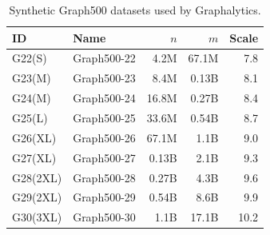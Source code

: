 \begin{table}[h]
\caption{Synthetic Graph500 datasets used by Graphalytics.}
\label{tab:graph500-datasets}
\centering
\begin{tabular}{|l|l|r|r|r|}
\hline
\textbf{ID} & \textbf{Name} & $n$ & $m$ & \textbf{Scale} \\
\hline \hline
G22(S) & Graph500-22 & 4.2M & 67.1M & 7.8
\\ \hline
G23(M) & Graph500-23 & 8.4M & 0.13B & 8.1
\\ \hline
G24(M) & Graph500-24 & 16.8M & 0.27B & 8.4
\\ \hline
G25(L) & Graph500-25 & 33.6M & 0.54B & 8.7
\\ \hline
G26(XL) & Graph500-26 & 67.1M & 1.1B & 9.0
\\ \hline
G27(XL) & Graph500-27 & 0.13B & 2.1B & 9.3
\\ \hline
G28(2XL) & Graph500-28 & 0.27B & 4.3B & 9.6
\\ \hline
G29(2XL) & Graph500-29 & 0.54B & 8.6B & 9.9
\\ \hline
G30(3XL) & Graph500-30 & 1.1B & 17.1B & 10.2
\\ \hline
\end{tabular}
\end{table}


